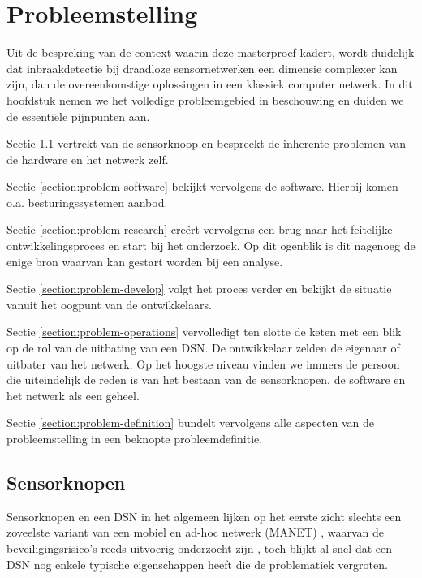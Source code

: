
\chapter{Probleemstelling}
\label{chapter:probleemstelling}

Uit de bespreking van de context waarin deze masterproef kadert, wordt
duidelijk dat inbraakdetectie bij draadloze sensornetwerken een dimensie
complexer kan zijn, dan de overeenkomstige oplossingen in een klassiek computer
netwerk. In dit hoofdstuk nemen we het volledige probleemgebied in beschouwing
en duiden we de essenti\"ele pijnpunten aan.

Sectie \ref{section:problem-hardware} vertrekt van de sensorknoop en bespreekt
de inherente problemen van de hardware en het netwerk zelf.

Sectie \ref{section:problem-software} bekijkt vervolgens de software. Hierbij
komen o.a. besturingssystemen aanbod.

Sectie \ref{section:problem-research} cre\"ert vervolgens een brug naar het
feitelijke ontwikkelingsproces en start bij het onderzoek. Op dit ogenblik is
dit nagenoeg de enige bron waarvan kan gestart worden bij een analyse.

Sectie \ref{section:problem-develop} volgt het proces verder en bekijkt de
situatie vanuit het oogpunt van de ontwikkelaars.

Sectie \ref{section:problem-operations} vervolledigt ten slotte de keten met
een blik op de rol van de uitbating van een DSN. De ontwikkelaar zelden de
eigenaar of uitbater van het netwerk. Op het hoogste niveau vinden we immers de
persoon die uiteindelijk de reden is van het bestaan van de sensorknopen, de
software en het netwerk als een geheel.

Sectie \ref{section:problem-definition} bundelt vervolgens alle aspecten van de
probleemstelling in een beknopte probleemdefinitie.

\section{Sensorknopen}
\label{section:problem-hardware}

Sensorknopen en een DSN in het algemeen lijken op het eerste zicht slechts een
zoveelste variant van een mobiel en ad-hoc netwerk (MANET)
\citep{garg2010mobile}, waarvan de beveiligingsrisico's reeds uitvoerig
onderzocht zijn \citep{djenouri2005survey, zhang2000intrusion,
kachirski2003effective}, toch blijkt al snel dat een DSN nog enkele typische
eigenschappen heeft die de problematiek vergroten.

